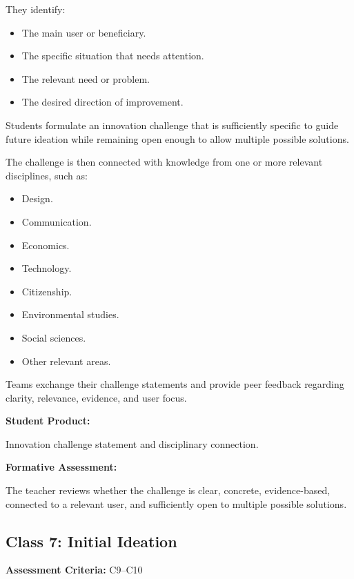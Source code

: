 \documentclass[12pt,a4paper]{article}
\begin{document}
	They identify:
	
	\begin{itemize}
		\item The main user or beneficiary.
		\item The specific situation that needs attention.
		\item The relevant need or problem.
		\item The desired direction of improvement.
	\end{itemize}
	
	Students formulate an innovation challenge that is sufficiently specific to guide future ideation while remaining open enough to allow multiple possible solutions.
	
	The challenge is then connected with knowledge from one or more relevant disciplines, such as:
	
	\begin{itemize}
		\item Design.
		\item Communication.
		\item Economics.
		\item Technology.
		\item Citizenship.
		\item Environmental studies.
		\item Social sciences.
		\item Other relevant areas.
	\end{itemize}
	
	Teams exchange their challenge statements and provide peer feedback regarding clarity, relevance, evidence, and user focus.
	
	\textbf{Student Product:}
	
	Innovation challenge statement and disciplinary connection.
	
	\textbf{Formative Assessment:}
	
	The teacher reviews whether the challenge is clear, concrete, evidence-based, connected to a relevant user, and sufficiently open to multiple possible solutions.
	
	
	\subsection{Class 7: Initial Ideation}
	
	\textbf{Assessment Criteria:} C9--C10
	
\end{document}
